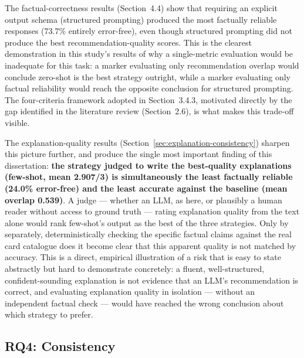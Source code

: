 The factual-correctness results (Section~4.4) show that requiring an explicit output schema (structured prompting) produced the most factually reliable responses (73.7\% entirely error-free), even though structured prompting did not produce the best recommendation-quality scores. This is the clearest demonstration in this study's results of why a single-metric evaluation would be inadequate for this task: a marker evaluating only recommendation overlap would conclude zero-shot is the best strategy outright, while a marker evaluating only factual reliability would reach the opposite conclusion for structured prompting. The four-criteria framework adopted in Section~3.4.3, motivated directly by the gap identified in the literature review (Section~2.6), is what makes this trade-off visible.

The explanation-quality results (Section~\ref{sec:explanation-consistency}) sharpen this picture further, and produce the single most important finding of this dissertation: \textbf{the strategy judged to write the best-quality explanations (few-shot, mean 2.907/3) is simultaneously the least factually reliable (24.0\% error-free) and the least accurate against the baseline (mean overlap 0.539)}. A judge --- whether an LLM, as here, or plausibly a human reader without access to ground truth --- rating explanation quality from the text alone would rank few-shot's output as the best of the three strategies. Only by separately, deterministically checking the specific factual claims against the real card catalogue does it become clear that this apparent quality is not matched by accuracy. This is a direct, empirical illustration of a risk that is easy to state abstractly but hard to demonstrate concretely: a fluent, well-structured, confident-sounding explanation is not evidence that an LLM's recommendation is correct, and evaluating explanation quality in isolation --- without an independent factual check --- would have reached the wrong conclusion about which strategy to prefer.

\subsection{RQ4: Consistency}


